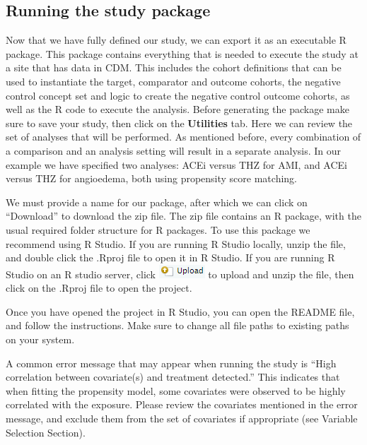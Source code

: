 \documentclass[]{book}
\begin{document}
\hypertarget{running-the-study-package}{%
\subsection{Running the study package}\label{running-the-study-package}}

Now that we have fully defined our study, we can export it as an executable R package. This package contains everything that is needed to execute the study at a site that has data in CDM. This includes the cohort definitions that can be used to instantiate the target, comparator and outcome cohorts, the negative control concept set and logic to create the negative control outcome cohorts, as well as the R code to execute the analysis. Before generating the package make sure to save your study, then click on the \textbf{Utilities} tab. Here we can review the set of analyses that will be performed. As mentioned before, every combination of a comparison and an analysis setting will result in a separate analysis. In our example we have specified two analyses: ACEi versus THZ for AMI, and ACEi versus THZ for angioedema, both using propensity score matching.

We must provide a name for our package, after which we can click on ``Download'' to download the zip file. The zip file contains an R package, with the usual required folder structure for R packages. \citep{Wickham_2015} To use this package we recommend using R Studio. If you are running R Studio locally, unzip the file, and double click the .Rproj file to open it in R Studio. If you are running R Studio on an R studio server, click \includegraphics{images/PopulationLevelEstimation/upload.png} to upload and unzip the file, then click on the .Rproj file to open the project.

Once you have opened the project in R Studio, you can open the README file, and follow the instructions. Make sure to change all file paths to existing paths on your system.

A common error message that may appear when running the study is ``High correlation between covariate(s) and treatment detected.'' This indicates that when fitting the propensity model, some covariates were observed to be highly correlated with the exposure. Please review the covariates mentioned in the error message, and exclude them from the set of covariates if appropriate (see Variable Selection Section). 
\end{document}
